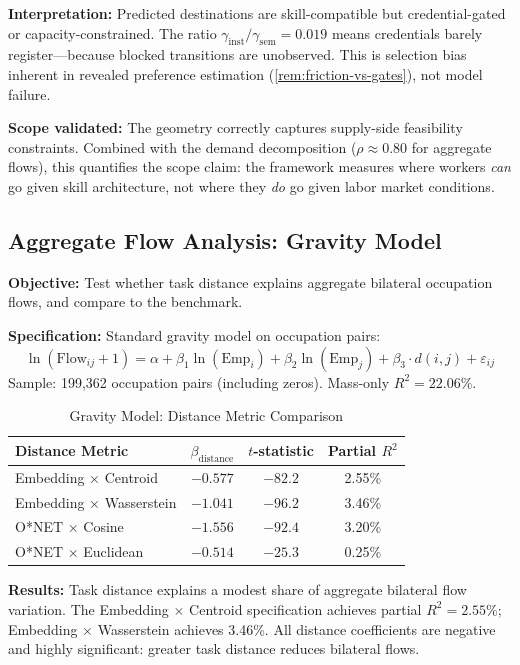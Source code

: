 \documentclass[12pt]{article}
\begin{document}
\textbf{Interpretation:} Predicted destinations are skill-compatible but credential-gated or capacity-constrained. The ratio $\gamma_{\mathrm{inst}}/\gamma_{\mathrm{sem}} = 0.019$ means credentials barely register---because blocked transitions are unobserved. This is selection bias inherent in revealed preference estimation (\cref{rem:friction-vs-gates}), not model failure.

\textbf{Scope validated:} The geometry correctly captures supply-side feasibility constraints. Combined with the demand decomposition ($\rho \approx 0.80$ for aggregate flows), this quantifies the scope claim: the framework measures where workers \emph{can} go given skill architecture, not where they \emph{do} go given labor market conditions.


\subsection{Aggregate Flow Analysis: Gravity Model}
\label{subsec:gravity}


\textbf{Objective:} Test whether task distance explains aggregate bilateral occupation flows, and compare to the \citet{CortesGallipoli2018} benchmark.

\textbf{Specification:} Standard gravity model on occupation pairs:
\[
\ln(\text{Flow}_{ij} + 1) = \alpha + \beta_1 \ln(\text{Emp}_i) + \beta_2 \ln(\text{Emp}_j) + \beta_3 \cdot d(i,j) + \varepsilon_{ij}
\]
Sample: 199,362 occupation pairs (including zeros). Mass-only $R^2 = 22.06\%$.


\begin{table}[h!]
\centering
\caption{Gravity Model: Distance Metric Comparison}
\label{tab:gravity-comparison}
\begin{tabular}{lccc}
\toprule
\textbf{Distance Metric} & $\beta_{\mathrm{distance}}$ & $t$-statistic & Partial $R^2$ \\
\midrule
Embedding $\times$ Centroid & $-0.577$ & $-82.2$ & 2.55\% \\
Embedding $\times$ Wasserstein & $-1.041$ & $-96.2$ & 3.46\% \\
O*NET $\times$ Cosine & $-1.556$ & $-92.4$ & 3.20\% \\
O*NET $\times$ Euclidean & $-0.514$ & $-25.3$ & 0.25\% \\
\bottomrule
\end{tabular}
\end{table}


\textbf{Results:} Task distance explains a modest share of aggregate bilateral flow variation. The Embedding $\times$ Centroid specification achieves partial $R^2 = 2.55\%$; Embedding $\times$ Wasserstein achieves 3.46\%. All distance coefficients are negative and highly significant: greater task distance reduces bilateral flows.
\end{document}
